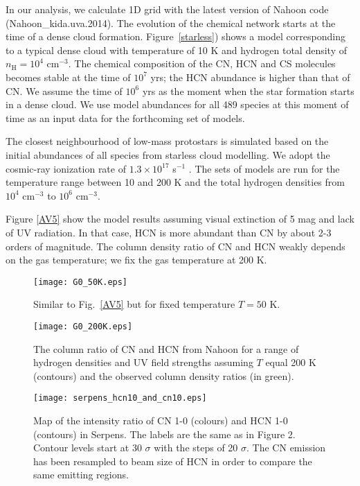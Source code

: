 \documentclass{aa}
\begin{document}
In our analysis, we calculate 1D grid with the latest version of Nahoon code (Nahoon\_kida.uva.2014). 
The evolution of the chemical network starts at the time of a dense cloud formation.
Figure~\ref{starless}) shows a model corresponding to a typical dense cloud with temperature of 10 K
and hydrogen total density of $n_\mathrm{H} = 10^4$ cm$^{-3}$. The chemical composition
of the CN, HCN and CS molecules becomes stable at the time of $10^{7}$ yrs; the HCN abundance is higher
than that of CN. We assume the time of $10^{6}$ yrs as the moment when the star formation starts in
a dense cloud. We use model abundances for all 489 species at this moment of time 
as an input data for the forthcoming set of models.

The closest neighbourhood of low-mass protostars is simulated based on the initial abundances of
all species from starless cloud modelling. We adopt the cosmic-ray ionization
rate of $1.3\times 10^{17}$ s$^{-1}$ \citep{Cra78}. The sets of models are run
for the temperature range between 10 and 200 K and the total hydrogen densities from $10^4$
cm$^{-3}$ to $10^6$ cm$^{-3}$. 

Figure \ref{AV5} show the model results assuming visual extinction of 5 mag and lack 
of UV radiation. In that case, HCN is more abundant than CN by about 2-3
orders of magnitude. The column density ratio of CN and HCN weakly depends on the 
gas temperature; we fix the gas temperature at 200 K.
\begin{figure} 
\centering \texttt{[image: G0\_50K.eps]} 
\caption{Similar to
Fig.~\ref{AV5} but for fixed temperature $T = 50$ K.} 
\label{G0} 
\end{figure}
\begin{figure} 
\centering 
\texttt{[image: G0\_200K.eps]} 
\caption{The column ratio of CN and HCN from Nahoon for a 
range of hydrogen densities and UV field strengths assuming $T$ equal 200 K (contours) 
and the observed column density ratios (in green).} 
\label{G0} 
\end{figure}
\begin{figure} 
\centering 
\texttt{[image: serpens\_hcn10\_and\_cn10.eps]}
\caption{Map of the intensity ratio of CN 1-0 (colours) and HCN 1-0
(contours) in Serpens. The labels are the same as in Figure 2. Contour levels start at 30 $\sigma$ with the steps of 20 $\sigma$.
The CN emission has been resampled to beam size of HCN in order to compare the same emitting regions.} 
\label{cn10_and_hcn10} 
\end{figure}
\end{document}

